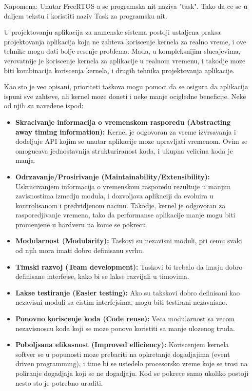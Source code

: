 \documentclass[a4paper,12pt, master]{etf}
\begin{document}
	Napomena: Unutar FreeRTOS-a se programska nit naziva "task". Tako da ce se u daljem tekstu 
	i koristiti naziv Task za programsku nit.

	U projektovanju aplikacija za namenske sistema postoji ustaljena praksa projektovanja
	aplikacija koja ne zahteva koriscenje kernela za realno vreme, i ove tehnike mogu dati 
	bolje resenje problema. Mada, u kompleksnijim slucajevima, verovatnije je koriscenje 
	kernela za aplikacije u realnom vremenu, i takodje moze biti kombinacija koriscenja 
	kernela, i drugih tehnika projektovanja aplikacije.

	Kao sto je vec opisani, prioriteti taskova mogu pomoci da se osigura da aplikacija ispuni 
	sve	zahteve, ali kernel moze doneti i neke manje ocigledne beneficije. Neke od njih su 
	navedene ispod:
	
	\begin{itemize}
		\item \textbf{Skracivanje informacija o vremenskom rasporedu (Abstracting away timing 
		information):} Kernel je odgovoran za vreme izvrsavanja i dodeljuje API kojim se 
		unutar aplikacije moze upravljati vremenom. Ovim se omogucava jednostavnija 
		strukturiranost koda, i ukupna velicina koda je manja.
		\item \textbf{Odrzavanje/Prosirivanje (Maintainability/Extensibility):}
		Uskracivanjem informacija o vremenskom rasporedu rezultuje u manjim zavisnostima 
		izmedju	modula, i dozvoljava aplikaciji da evoluira u kontrolisanom i predvidjenom 
		nacinu. Takodje, kernel je odgovoran za rasporedjivanje vremena, tako da performanse 
		aplikacije manje mogu biti promenjene u hardveru na kome se pokrecu.
		\item \textbf{Modularnost (Modularity):}
		Taskovi su nezavisni moduli, pri cemu svaki od njih mora imati dobro definisanu svrhu.
		\item \textbf{Timski razvoj (Team development):}
		Taskovi bi trebalo da imaju dobro definisane interfejse, kako bi se lakse razvijali u
		timovima.
		\item \textbf{Lakse testiranje (Easier testing):}
		Ako su takskovi dobro definisani kao nezavisni moduli sa cistim interfejsima, mogu biti
		testirani nezavnisno.
		\item \textbf{Ponovno koriscenje koda (Code reuse):}
		Veca modularnost sa vecom nezavisnoscu koda koji se moze ponovo koristiti sa manje 
		ulozenog truda.
		\item \textbf{Poboljsana efikasnost (Improved efficiency):}
		Koriscenjem kernela softver se u popunosti moze prebaciti na opkretanje dogadjajima 
		(event driven programming), i time bi se ustedelo procesorsko vreme koje se trosi na 
		poliranje dogadjaja koji se ne dogadjaju. Kod se pokrece samo ukoliko postoji nesto 
		sto je potrebno	uraditi.


\end{itemize}
\end{document}
